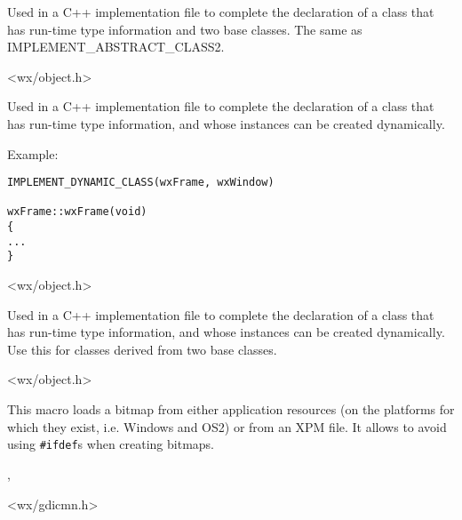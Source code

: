 Used in a C++ implementation file to complete the declaration of a
class that has run-time type information and two base classes. The
same as IMPLEMENT\_ABSTRACT\_CLASS2.


<wx/object.h>



Used in a C++ implementation file to complete the declaration of
a class that has run-time type information, and whose instances
can be created dynamically.

Example:

\begin{verbatim}
IMPLEMENT_DYNAMIC_CLASS(wxFrame, wxWindow)

wxFrame::wxFrame(void)
{
...
}
\end{verbatim}


<wx/object.h>



Used in a C++ implementation file to complete the declaration of
a class that has run-time type information, and whose instances
can be created dynamically. Use this for classes derived from two
base classes.


<wx/object.h>

\label{wxbitmapmacro}


This macro loads a bitmap from either application resources (on the platforms
for which they exist, i.e. Windows and OS2) or from an XPM file. It allows to
avoid using {\tt \#ifdef}s when creating bitmaps.


,


<wx/gdicmn.h>

\label{wxconstcast}


